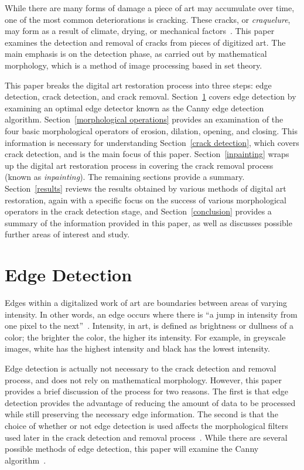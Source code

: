 \documentclass{sig-alternate}
\begin{document}
While there are many forms of damage a piece of art may accumulate over time, one of the most common deteriorations is cracking. These cracks, or \textit{craquelure}, may form as a result of climate, drying, or mechanical factors~\cite{Altarpiece:2013, Statistics:2013, TopHat:2010}. This paper examines the detection and removal of cracks from pieces of digitized art. The main emphasis is on the detection phase, as carried out by mathematical morphology, which is a method of image processing based in set theory.

This paper breaks the digital art restoration process into three steps: edge detection, crack detection, and crack removal. Section~\ref{edge detection} covers edge detection by examining an optimal edge detector known as the Canny edge detection algorithm. Section~\ref{morphological operations} provides an examination of the four basic morphological operators of erosion, dilation, opening, and closing. This information is necessary for understanding Section~\ref{crack detection}, which covers crack detection, and is the main focus of this paper. Section~\ref{inpainting} wraps up the digital art restoration process in covering the crack removal process (known as \textit{inpainting}). The remaining sections provide a summary. Section~\ref{results} reviews the results obtained by various methods of digital art restoration, again with a specific focus on the success of various morphological operators in the crack detection stage, and Section~\ref{conclusion} provides a summary of the information provided in this paper, as well as discusses possible further areas of interest and study.

\section{Edge Detection}\label{edge detection}
Edges within a digitalized work of art are boundaries between areas of varying intensity. In other words, an edge occurs where there is ``a jump in intensity from one pixel to the next''~\cite{CannySummarized}. Intensity, in art, is defined as brightness or dullness of a color; the brighter the color, the higher its intensity. For example, in greyscale images, white has the highest intensity and black has the lowest intensity.

Edge detection is actually not necessary to the crack detection and removal process, and does not rely on mathematical morphology. However, this paper provides a brief discussion of the process for two reasons. The first is that edge detection provides the advantage of reducing the amount of data to be processed while still preserving the necessary edge information. The second is that the choice of whether or not edge detection is used affects the morphological filters used later in the crack detection and removal process~\cite{CannySummarized}. While there are several possible methods of edge detection, this paper will examine the Canny algorithm~\cite{Canny:1986, CannySummarized}.
\end{document}
